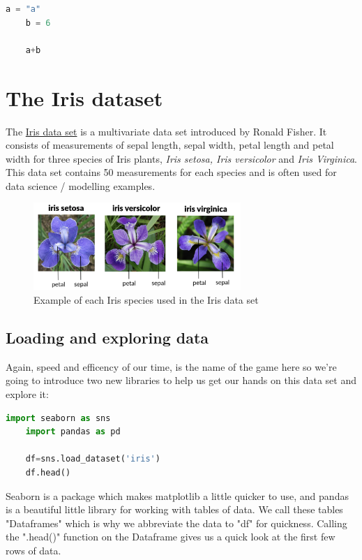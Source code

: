 \documentclass[12pt]{article}
\begin{document}
\begin{lstlisting}[language=Python]
    a = "a"
    b = 6

    a+b
\end{lstlisting}

\clearpage

\section{The Iris dataset}

The \href{https://en.wikipedia.org/wiki/Iris_flower_data_set}{Iris data set} is a multivariate data set introduced by Ronald Fisher. It consists of measurements of sepal length, sepal width, petal length and petal width for three species of Iris plants, \textit{Iris setosa, Iris versicolor} and \textit{Iris Virginica}. This data set contains 50 measurements for each species and is often used for data science / modelling examples. 

\begin{figure}[!h]
    \centering
    \includegraphics[width=0.7\textwidth]{figures/ssIM2.png}
    \caption{Example of each Iris species used in the Iris data set}
\end{figure}

\subsection{Loading and exploring data} 

Again, speed and efficency of our time, is the name of the game here so we're going to introduce two new libraries to help us get our hands on this data set and explore it: 

\begin{lstlisting}[language=Python]
    import seaborn as sns 
    import pandas as pd

    df=sns.load_dataset('iris')
    df.head()
\end{lstlisting}

Seaborn is a package which makes matplotlib a little quicker to use, and pandas is a beautiful little library for working with tables of data. We call these tables "Dataframes" which is why we abbreviate the data to "df" for quickness. Calling the ".head()" function on the Dataframe gives us a quick look at the first few rows of data. 
\end{document}
